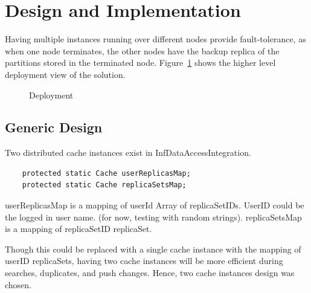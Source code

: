 \documentclass[conference]{IEEEtran}
\begin{document}
\section{Design and Implementation}
\balance
Having multiple instances running over different nodes provide fault-tolerance, as when one node terminates, the other nodes have the backup replica of the partitions stored in the terminated node. Figure~\ref{fig:deployment} shows the higher level deployment view of the solution.
\begin{figure}[!htbp]
\begin{center}
\end{center}
 \caption{Deployment}
 \label{fig:deployment}
\end{figure}

\subsection{Generic Design}
Two distributed cache instances exist in InfDataAccessIntegration.
\begin{lstlisting}  
    protected static Cache userReplicasMap;
    protected static Cache replicaSetsMap;
\end{lstlisting}  
userReplicasMap is a mapping of userId  Array of replicaSetIDs. UserID could be the logged in user name. (for now, testing with random strings).
replicaSetsMap is a mapping of replicaSetID  replicaSet.

Though this could be replaced with a single cache instance with the mapping of userID  replicaSets, having two cache instances will be more efficient during searches, duplicates, and push changes. Hence, two cache instances design was chosen.
\end{document}
